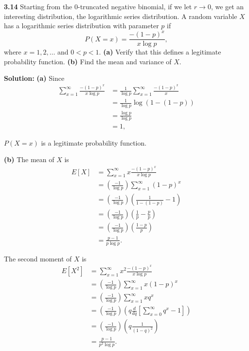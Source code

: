 \documentclass{article}
\newcommand{\mybox}{%
    \collectbox{%
        \setlength{\fboxsep}{1pt}%
        \fbox{\BOXCONTENT}%
    }%
}
\begin{document}
\pagebreak

\noindent\mybox{\textbf{3.14}}  Starting from the 0-truncated negative binomial, if we let $r\rightarrow 0$, we get an interesting distribution, the logarithmic series distribution.  A random variable $X$ has a logarithmic series distribution with parameter $p$ if $$P(X=x) = \frac{-(1-p)^x}{x \log p},$$ where $x=1, 2, \ldots$ and $0<p<1$.  \textbf{(a)}  Verify that this defines a legitimate probability function.  \textbf{(b)}  Find the mean and variance of $X$.

\vspace{3mm}

\noindent\mybox{\textbf{Solution:}}  \textbf{(a)}  Since 
\begin{align}
\sum\limits_{x=1}^{\infty}\frac{-(1-p)^x}{x \log p} &= \frac{1}{\log p}\sum\limits_{x=1}^{\infty} \frac{-(1-p)^x}{x} \\
&=\frac{1}{\log p}\log(1-(1-p))  \\
&= \frac{\log p}{\log p} \\
&= 1,
\end{align}

\noindent $P(X=x)$ is a legitimate probability function.

\vspace{3mm}

\noindent\textbf{(b)}  The mean of $X$ is 
\begin{align}
E[X] &= \sum\limits_{x=1}^{\infty}x\frac{-(1-p)^x}{x \log p} \\
&= \left(\frac{-1}{\log p}\right)\sum\limits_{x=1}^{\infty} (1-p)^x \\
&= \left(\frac{-1}{\log p}\right)\left(\frac{1}{1-(1-p)} - 1\right) \\
&= \left(\frac{-1}{\log p}\right)\left(\frac{1}{p} - \frac{p}{p}\right) \\
&= \left(\frac{-1}{\log p}\right)\left(\frac{1-p}{p}\right) \\
&= \frac{p - 1}{p \log p}.
\end{align}

\noindent The second moment of $X$ is 
\begin{align}
E[X^2] &= \sum\limits_{x=1}^{\infty}x^2\frac{-(1-p)^x}{x \log p} \\
&= \left(\frac{-1}{\log p}\right)\sum\limits_{x=1}^{\infty} x(1-p)^x \\
&= \left(\frac{-1}{\log p}\right) \sum_{x=1}^{\infty} x q^x \\
&= \left(\frac{-1}{\log p}\right)\left(q\frac{d}{dq}\left[ \sum_{x=0}^{\infty}q^x - 1 \right]\right) \\
&= \left(\frac{-1}{\log p}\right)\left(q\frac{1}{(1-q)^2}\right) \\
&= \frac{p-1}{p^2 \log p}.
\end{align}
\end{document}
